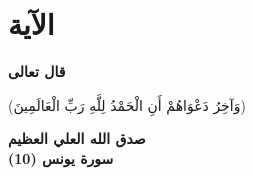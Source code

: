 \chapter*{الآية}

\begin{Large}
	\textbf{قال تعالى}
\begin{center}
		‎‏(وَآخِرُ دَعْوَاهُمْ أَنِ الْحَمْدُ لِلَّهِ رَبِّ الْعَالَمِينَ) 
\end{center}
\begin{flushleft}
\textbf{صدق الله العلي العظيم}\\
\noindent
\textbf{سورة يونس (10)}
\end{flushleft}

\end{Large}


